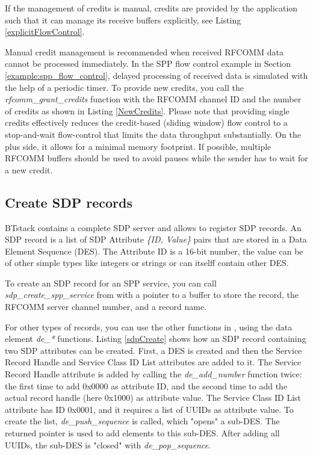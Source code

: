 \documentclass[a4paper,titlepage,oneside,12pt]{amsart} %
\begin{document}
If the management of credits is manual, credits are provided by the application such that it can manage its receive buffers explicitly, see Listing \ref{explicitFlowControl}.

Manual credit management is recommended when received RFCOMM data cannot be processed immediately. In the SPP flow control example in Section \ref{example:spp_flow_control}, delayed processing of received data is simulated with the help of a periodic timer. To provide new credits, you call the \emph{rfcomm\_grant\_credits} function with the RFCOMM channel ID and the number of credits as shown in Listing \ref{NewCredits}.
Please note that providing single credits effectively reduces the credit-based (sliding window) flow control to a stop-and-wait flow-control that limits the data throughput substantially. On the plus side, it allows for a minimal memory footprint. If possible, multiple RFCOMM buffers should be used to avoid pauses while the sender has to wait for a new credit.


\subsection{Create SDP records}
BTstack contains a complete SDP server and allows to register SDP records. An SDP record is a list of SDP Attribute \emph{\{ID, Value\}} pairs that are stored in a Data Element Sequence (DES). The Attribute ID is a 16-bit number, the value can be of other simple types like integers or strings or can itselff contain other DES. 


To create an SDP record for an SPP service, you can call \emph{sdp\_create\_spp\_service} from  with a pointer to a buffer to store the record, the \mbox{RFCOMM} server channel number, and a record name. 

For other types of records, you can use the other functions in , using the data element \emph{de\_*} functions.  Listing \ref{sdpCreate} shows how an SDP record containing two SDP attributes can be created. First, a DES is created and then the Service Record Handle and Service Class ID List attributes are added to it. The Service Record Handle attribute is added by calling the \emph{de\_add\_number} function twice: the first time to add 0x0000 as attribute ID, and the second time to add the actual record handle (here 0x1000) as attribute value. The Service Class ID List attribute has ID 0x0001, and it requires a list of UUIDs as attribute value. To create the list, \emph{de\_push\_sequence} is called, which "opens" a sub-DES. The returned pointer is used to add elements to this sub-DES. After adding all UUIDs, the sub-DES is "closed" with \emph{de\_pop\_sequence}.
\end{document}
